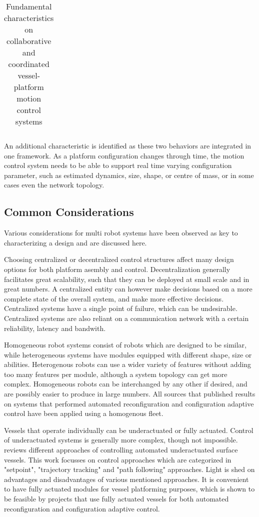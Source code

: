 \begin{table}[H]
\begin{adjustbox}{width=1\textwidth}
\begin{tabular}{|l|l|l|}
			
			
		\end{tabular}
	\end{adjustbox}
	\caption{Fundamental characteristics on collaborative and coordinated vessel-platform motion control systems}
	\label{tab:adaptiveCharacteristicsSummed}
\end{table}


An additional characteristic is identified as these two behaviors are integrated in one framework. As a platform configuration changes through time, the motion control system needs to be able to support real time varying configuration parameter, such as estimated dynamics, size, shape, or centre of mass, or in some cases even the network topology. 

\subsection{Common Considerations}
Various considerations for multi robot systems have been observed as key to characterizing a design and are discussed here.

Choosing centralized or decentralized control structures affect many design options for both platform asembly and control. Decentralization generally facilitates great scalability, such that they can be deployed at small scale and in great numbers. A centralized entity can however make decisions based on a more complete state of the overall system, and make more effective decisions. Centralized systems have a single point of failure, which can be undesirable. Centralized systems are also reliant on a communication network with a certain reliability, latency and bandwith.

Homogeneous robot systems consist of robots which are designed to be similar, while heterogeneous systems have modules equipped with different shape, size or abilities. Heterogenous robots can use a wider variety of features without adding too many features per module, although a system topology can get more complex. Homogeneous robots can be interchanged by any other if desired, and are possibly easier to produce in large numbers. All sources that published results on systems that performed automated reconfiguration and configuration adaptive control have been applied using a homogenous fleet.

Vessels that operate individually can be underactuated or fully actuated. Control of underactuated systems is generally more complex, though not impossible. \citet{ashrafiuon2010review} reviews different approaches of controlling automated  underactuated surface vessels. This work focusses on control approaches which are categorized in "setpoint", "trajectory tracking" and "path following" approaches. Light is shed on advantages and disadvantages of various mentioned approaches. It is convenient to have fully actuated modules for vessel platforming purposes, which is shown to be feasible by projects that use fully actuated vessels for both automated reconfiguration and configuration adaptive control. 

